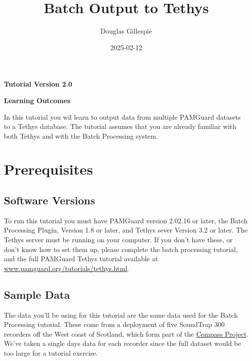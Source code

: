 \documentclass[
]{article}
\title{Batch Output to Tethys}
\author[1]{Douglas Gillespie}
\affil[1]{Sea Mammal Research Unit, University of St Andrews}
\date{2025-02-12}
\renewcommand*\contentsname{Table of contents}
\newcommand\contentsname{Table of contents}
\begin{document}
\maketitle

\centerline{\textbf{Tutorial Version 2.0}}
\vspace{3cm}


\centerline{\textbf{Learning Outcomes}}

In this tutorial you wil learn to output data from multiple PAMGuard datasets
to a Tethys database. The tutorial assumes that you are already familiar
with both Tethys and with the Batch Processing system.

\renewcommand*\contentsname{Table of contents}
{
\hypersetup{linkcolor=}
\setcounter{tocdepth}{3}
\tableofcontents
}

\newpage{}

\pagestyle{plain}

\section{Prerequisites}\label{prerequisites}

\subsection{Software Versions}\label{software-versions}

To run this tutorial you must have PAMGuard version 2.02.16 or later,
the Batch Processing Plugin, Version 1.8 or later, and Tethys sever
Version 3.2 or later. The Tethys server must be running on your
computer. If you don't have these, or don't know how to set them up,
please complete the batch processing tutorial, and the full PAMGuard
Tethys tutorial available at
\href{https://www.pamguard.org/tutorials/tethys.html}{www.pamguard.org/tutorials/tethys.html}.

\subsection{Sample Data}\label{sample-data}

The data you'll be using for this tutorial are the same data used for
the Batch Processing tutorial. These come from a deployment of five
SoundTrap 300 recorders off the West coast of Scotland, which form part
of the \href{https://www.sams.ac.uk/science/projects/compass/}{Compass
Project}. We've taken a single days data for each recorder since the
full dataset would be too large for a tutorial exercise.
\end{document}
